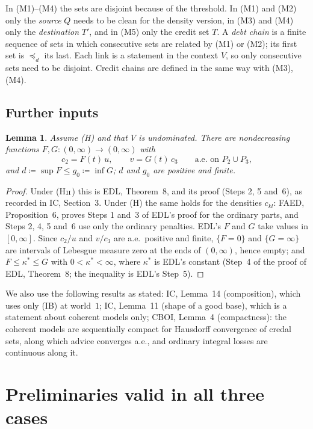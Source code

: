 \documentclass[11pt]{article}
\newtheorem{lemma}[theorem]{Lemma}
\theoremstyle{definition}\newtheorem{definition}[theorem]{Definition}
\theoremstyle{remark}\newtheorem{remark}[theorem]{Remark}
\begin{document}
In (M1)--(M4) the sets are disjoint because of the threshold. In (M1) and
(M2) only the \emph{source} $Q$ needs to be clean for the density version,
in (M3) and (M4) only the \emph{destination} $T'$, and in (M5) only the credit
set $T$. A \emph{debt chain} is a finite sequence of sets in which
consecutive sets are related by (M1) or (M2); its first set is $\preceq_d$ its
last. Each link is a statement in the context $V$, so only consecutive sets
need to be disjoint. Credit chains are defined in the same way with (M3),
(M4).

\subsection{Further inputs}

\begin{lemma}\label{lem:FG}
Assume (H) and that $V$ is undominated. There are nondecreasing functions
$F,G\colon(0,\infty)\to(0,\infty)$ with
\[
 c_2=F(t)\,u,\qquad v=G(t)\,c_3\qquad\text{a.e.\ on }P_2\cup P_3,
\]
and $d\coloneqq\sup F\le g_0\coloneqq\inf G$; $d$ and $g_0$ are positive and
finite.
\end{lemma}
\begin{proof}
Under (H$_{\rm II}$) this is EDL, Theorem~8, and its proof (Steps 2, 5
and~6), as recorded in IC, Section~3. Under (H) the same holds for the
densities $c_{kl}$: FAED, Proposition~6, proves Steps 1 and~3 of EDL's proof
for the ordinary parts, and Steps 2, 4, 5 and~6 use only the ordinary
penalties. EDL's $F$ and $G$ take values in $[0,\infty]$. Since $c_2/u$ and
$v/c_3$ are a.e.\ positive and finite, $\{F=0\}$ and $\{G=\infty\}$ are
intervals of Lebesgue measure zero at the ends of $(0,\infty)$, hence empty;
and $F\le\kappa^*\le G$ with $0<\kappa^*<\infty$, where $\kappa^*$ is
EDL's constant (Step~4 of the proof of EDL, Theorem~8; the inequality is
EDL's Step~5).
\end{proof}

We also use the following results as stated: IC, Lemma~14 (composition), which
uses only (IB) at world~$1$; IC, Lemma~11 (shape of a good base), which is a
statement about coherent models only; CBOI, Lemma~4 (compactness): the
coherent models are sequentially compact for Hausdorff convergence of credal
sets, along which advice converges a.e., and ordinary integral losses are
continuous along it.

\section{Preliminaries valid in all three cases}\label{sec:prelim}
\end{document}
